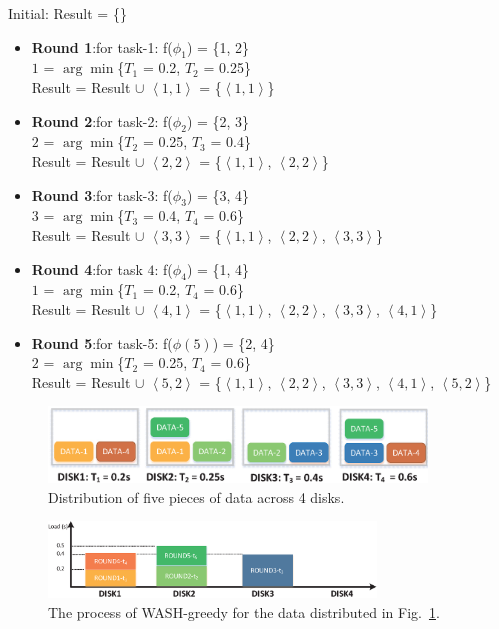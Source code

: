 \documentclass[conference]{IEEEtran}
\begin{document}
Initial: Result = \{\}
\begin{itemize}
	\item \textbf{Round 1}:for task-1:
	 f($\phi_1$) = \{1, 2\} \\
	 $1$ = $\arg\min$\{$T_1$ = 0.2, $T_2$ = 0.25\}\\
	Result = Result $\cup$ $\left \langle 1, 1\right \rangle$ = \{$\left \langle 1, 1\right \rangle$\}
	\item \textbf{Round 2}:for task-2:
	f($\phi_2$) = \{2, 3\}\\
	$2$ = $\arg\min$\{$T_2$ = 0.25, $T_3$ = 0.4\}\\
	Result = Result $\cup$ $\left \langle 2, 2\right \rangle$ = \{$\left \langle 1, 1\right \rangle$, $\left \langle 2, 2\right \rangle$\}
	\item \textbf{Round 3}:for task-3:
	f($\phi_3$) = \{3, 4\}\\
	$3$ = $\arg\min$\{$T_3$ = 0.4, $T_4$ = 0.6\}\\
	Result = Result $\cup$ $\left \langle 3, 3\right \rangle$ = \{$\left \langle 1, 1\right \rangle$, $\left \langle 2, 2\right \rangle$,  $\left \langle 3, 3\right \rangle$\}
	\item \textbf{Round 4}:for task  $4$:
	f($\phi_4$) = \{1, 4\}\\
	$1$ = $\arg\min$\{$T_1$ = 0.2, $T_4$ = 0.6\}\\
	Result = Result $\cup$ $\left \langle 4, 1\right \rangle$ = \{$\left \langle 1, 1\right \rangle$, $\left \langle 2, 2\right \rangle$,  $\left \langle 3, 3\right \rangle$, $\left \langle 4, 1\right \rangle$\}	
	\item \textbf{Round 5}:for task-5:
	f($\phi(5)$) = \{2, 4\}\\
	$2$ = $\arg\min$\{$T_2$ = 0.25, $T_4$ = 0.6\}\\
	Result = Result $\cup$ $\left \langle 5, 2\right \rangle$ = \{$\left \langle 1, 1\right \rangle$, $\left \langle 2, 2\right \rangle$,  $\left \langle 3, 3\right \rangle$, $\left \langle 4, 1\right \rangle$, $\left \langle 5, 2\right \rangle$\}	
	
\end{itemize}
\begin{figure}[!t]
	\centering
	\includegraphics[height=0.8in]{fig1_10.eps}
	\caption{Distribution of five pieces of data across 4 disks.  }
	\label{fig1}
	\vspace{-0.4cm}
\end{figure}
\begin{figure}[!t]
	\centering
	\includegraphics[height=0.8in]{fig2_3.eps}
	\caption{The process of WASH-greedy for the data distributed in Fig.~\ref{fig1}. }
	\label{fig2}
	\vspace{-0.4cm}
\end{figure}
\end{document}
